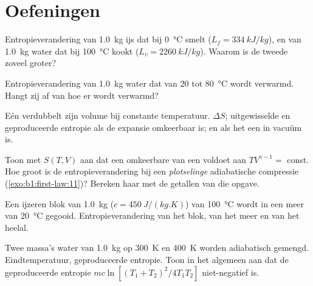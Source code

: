 \section{Oefeningen}

\begin{exercise}[$\star$]\label{exo:b1:second-law-entropy:1}
Entropieverandering van \qty{1.0}{kg} ijs dat bij \qty{0}{\degreeCelsius} smelt
($L_f = \qty{334}{kJ/kg}$), en van \qty{1.0}{kg} water dat bij
\qty{100}{\degreeCelsius} kookt ($L_v = \qty{2260}{kJ/kg}$). Waarom is de tweede zoveel
groter?
\end{exercise}

\begin{exercise}[$\star$]\label{exo:b1:second-law-entropy:2}
Entropieverandering van \qty{1.0}{kg} water dat van \qty{20}{} tot
\qty{80}{\degreeCelsius} wordt verwarmd. Hangt zij af van hoe er wordt verwarmd?
\end{exercise}

\begin{exercise}[$\star$]\label{exo:b1:second-law-entropy:3}
Eén   verdubbelt zijn volume bij constante temperatuur.
$\Delta S$; uitgewisselde en geproduceerde entropie als de expansie omkeerbaar is;
en als het een  in vacuüm is.
\end{exercise}

\begin{exercise}[$\star$]\label{exo:b1:second-law-entropy:4}
Toon met $S(T, V)$ aan dat een omkeerbare  van een
 voldoet aan $TV^{\gamma - 1} = $ const. Hoe groot is de entropieverandering bij
een \emph{plotselinge} adiabatische compressie (\cref{exo:b1:first-law:11})?
Bereken haar met de getallen van die opgave.
\end{exercise}

\begin{exercise}[$\star\star$]\label{exo:b1:second-law-entropy:5}
Een ijzeren blok van \qty{1.0}{kg} ($c = \qty{450}{J/(kg.K)}$) van \qty{100}{\degreeCelsius}
wordt in een meer van \qty{20}{\degreeCelsius} gegooid. Entropieverandering van het
blok, van het meer en van het heelal.
\end{exercise}

\begin{exercise}[$\star\star$]\label{exo:b1:second-law-entropy:6}
Twee massa's water van \qty{1.0}{kg} op \qty{300}{K} en \qty{400}{K} worden
adiabatisch gemengd. Eindtemperatuur, geproduceerde entropie. Toon in het algemeen aan
dat de geproduceerde entropie $mc\ln[(T_1 + T_2)^2/4T_1T_2]$ niet-negatief is.
\end{exercise}

